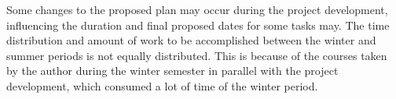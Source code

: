 Some changes to the proposed plan may occur during the project development, influencing the duration and final proposed dates for some tasks may. The time distribution and amount of work to be accomplished between the winter and summer periods is not equally distributed. This is because of the courses taken by the author during the winter semester in parallel with the project development, which consumed a lot of time of the winter period.\\
